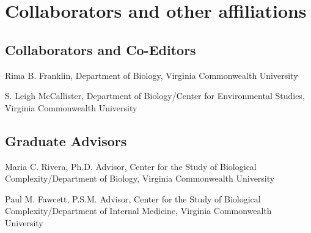\section{Collaborators and other affiliations}

\subsection*{Collaborators and Co-Editors}
\begin{packed_item}
	\item{Rima B. Franklin, Department of Biology, Virginia Commonwealth University}
	\item{S. Leigh McCallister, Department of Biology/Center for Environmental Studies, 
	Virginia Commonwealth University}		
\end{packed_item}

\subsection*{Graduate Advisors}

\begin{packed_item}
	\item{Maria C. Rivera, Ph.D. Advisor, Center for the Study of Biological Complexity/Department of Biology, 
	Virginia Commonwealth University }	
	\item{Paul M. Fawcett, P.S.M. Advisor,  Center for the Study of Biological Complexity/Department of Internal 
	Medicine, Virginia Commonwealth University}	
\end{packed_item}


\renewcommand{\thesection}{\Arabic{section}}
\renewcommand{\thesubsection}{\thesection.\Arabic{subsection}}




